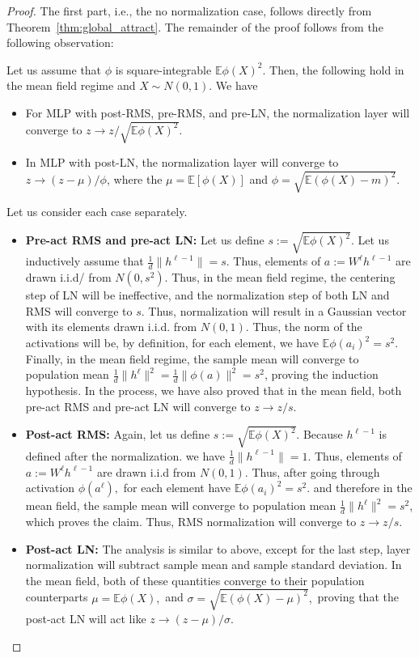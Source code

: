 \documentclass[twoside]{article}
\newcommand{\E}{\mathbb{E}}
\theoremstyle{definition}
\begin{document}
\begin{proof}
The first part, i.e., the no normalization case, follows directly from Theorem~\ref{thm:global_attract}. The remainder of the proof follows from the following observation:

Let us assume that $\phi$ is square-integrable $\E \phi(X)^2$. Then, the following hold in the mean field regime and $X\sim N(0,1).$ We have 
\begin{itemize}
    \item For MLP with post-RMS, pre-RMS, and pre-LN, the normalization layer will converge to  $z\to z/\sqrt{\E \phi(X)^2}$.
    \item In MLP with post-LN, the normalization layer will converge to $z \to  (z-\mu)/\phi$, where the $\mu = \E[\phi(X)]$ and $\phi = \sqrt{\E (\phi(X) - m)^2 }.$ 
\end{itemize}

Let us consider each case separately.

\begin{itemize}
    \item \textbf{Pre-act RMS and pre-act LN:} 
 Let us define $s:= \sqrt{\E \phi(X)^2}.$ Let us inductively assume that $\frac1d \|h^{\ell-1}\| = s.$ Thus, elements of $a:= W^\ell h^{\ell-1}$ are drawn i.i.d/ from $N(0,s^2).$ Thus, in the mean field regime, the centering step of LN will be ineffective, and the normalization step of both LN and RMS will converge to $s.$ Thus, normalization will result in a Gaussian vector with its elements drawn i.i.d. from $N(0,1).$ Thus, the norm of the activations will be, by definition, for each element, we have $\E \phi(a_i)^2 = s^2.$ Finally, in the mean field regime, the sample mean will converge to population mean $\frac1d\|h^\ell\|^2 = \frac1d\|\phi(a)\|^2 = s^2 $, proving the induction hypothesis. In the process, we have also proved that in the mean field, both pre-act RMS and pre-act LN will converge to $z\to z/ s.$

\item \textbf{Post-act RMS:} Again, let us define $s:= \sqrt{\E \phi(X)^2}.$ Because $h^{\ell-1}$ is defined after the normalization. we have $\frac1d \|h^{\ell-1}\| = 1.$ Thus, elements of $a:= W^\ell h^{\ell-1}$ are drawn i.i.d from $N(0,1).$ Thus, after going through activation $\phi(a^\ell),$ for each element have $\E \phi(a_i)^2 = s^2.$ and therefore in the mean field, the sample mean will converge to population mean $\frac1d\|h^\ell\|^2 = s^2 $, which proves the claim. Thus, RMS normalization will converge to $z \to z/ s.$
    \item \textbf{Post-act LN:} The analysis is similar to above, except for the last step, layer normalization will subtract sample mean and sample standard deviation. In the mean field, both of these quantities converge to their population counterparts $\mu = \E \phi(X),$ and $\sigma = \sqrt{\E (\phi(X) - \mu)^2 },$ proving that the post-act LN will act like $z \to  (z-\mu)/\sigma.$ 
\end{itemize}


\end{proof}
\end{document}
